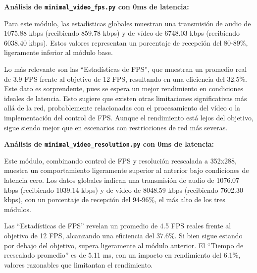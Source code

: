 \textbf{Análisis de \texttt{minimal\_video\_fps.py} con 0ms de latencia:}
\vspace{\baselineskip}

Para este módulo, las estadísticas globales muestran una transmisión de audio de 1075.88 kbps (recibiendo 859.78 kbps) y de vídeo de 6748.03 kbps (recibiendo 6038.40 kbps). Estos valores representan un porcentaje de recepción del 80-89\%, ligeramente inferior al módulo base.
\vspace{\baselineskip}

Lo más relevante son las ``Estadísticas de FPS'', que muestran un promedio real de 3.9 FPS frente al objetivo de 12 FPS, resultando en una eficiencia del 32.5\%. Este dato es sorprendente, pues se espera un mejor rendimiento en condiciones ideales de latencia. Esto sugiere que existen otras limitaciones significativas más allá de la red, probablemente relacionadas con el procesamiento del vídeo o la implementación del control de FPS. Aunque el rendimiento está lejos del objetivo, sigue siendo mejor que en escenarios con restricciones de red más severas.

\vspace{\baselineskip}

\textbf{Análisis de \texttt{minimal\_video\_resolution.py} con 0ms de latencia:}
\vspace{\baselineskip}

Este módulo, combinando control de FPS y resolución reescalada a 352x288, muestra un comportamiento ligeramente superior al anterior bajo condiciones de latencia cero. Los datos globales indican una transmisión de audio de 1076.07 kbps (recibiendo 1039.14 kbps) y de vídeo de 8048.59 kbps (recibiendo 7602.30 kbps), con un porcentaje de recepción del 94-96\%, el más alto de los tres módulos.
\vspace{\baselineskip}

Las ``Estadísticas de FPS'' revelan un promedio de 4.5 FPS reales frente al objetivo de 12 FPS, alcanzando una eficiencia del 37.6\%. Si bien sigue estando por debajo del objetivo, supera ligeramente al módulo anterior. El ``Tiempo de reescalado promedio'' es de 5.11 ms, con un impacto en rendimiento del 6.1\%, valores razonables que limitantan el rendimiento.

\vspace{\baselineskip}

